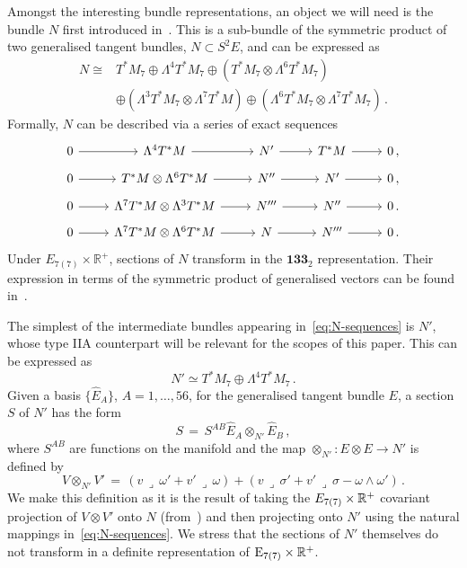 \documentclass[debug]{phd}
\begin{document}
			Amongst the interesting bundle representations, an object we will need is the bundle $N$ first introduced in~\cite{Coimbra:2011ky}. 
			This is a sub-bundle of the symmetric product of two generalised tangent bundles, $N \subset S^2 E$, and can be expressed as
				\begin{equation}\label{MthNbundle}
					\begin{split}
						N \cong & T^*M_7 \oplus \Lambda^4 T^*M_7 \oplus (T^*M_7 \otimes \Lambda^6T^*M_7) \\[1mm]
						& \oplus (\Lambda^3T^*M_7\otimes \Lambda^7T^*M)\oplus (\Lambda^6T^*M_7 \otimes \Lambda^7T^*M_7) \,.
					\end{split}
				\end{equation}
Formally, $N$ can be described via a series of exact sequences
%
\begin{equation}
\label{eq:N-sequences}
\begin{tikzcd}[row sep=tiny]
										0 \arrow{r} &\Lambda^4 T^*M \arrow{r} &N' \arrow{r} &T^*M \arrow{r} &0 	\, , \\
										0 \arrow{r} & T^*M\otimes \Lambda^6T^*M  \arrow{r} &N'' \arrow{r} &N' \arrow{r} &0 	\, , \\
										0 \arrow{r} &\Lambda^7 T^*M \otimes \Lambda^3 T^*M \arrow{r} &N''' \arrow{r} &N'' \arrow{r} &0 \, . \\
										0 \arrow{r} &\Lambda^7 T^*M \otimes \Lambda^6 T^*M \arrow{r} &N \arrow{r} &N''' \arrow{r} &0 \, .
									\end{tikzcd}
\end{equation}
%
Under $E_{7(7)}\times \mathbb{R}^+$, sections of $N$ transform in the $\mathbf{133}_{2}$ representation. 
Their expression in terms of the symmetric product of generalised vectors can be found in~\cite{Coimbra:2011ky}. 

The simplest of the intermediate bundles appearing in~\eqref{eq:N-sequences} is $N'$, whose type IIA counterpart will be relevant for the scopes of this paper. This can be expressed as
\begin{equation}\label{MthN'}
N' \simeq  T^*M_7 \oplus \Lambda^4 T^*M_7\,.
\end{equation}
Given a basis $\{\hat E_A\}$, $A = 1,\ldots, 56$, for the generalised tangent bundle $E$, a section $S$ of $N'$ has the form
\begin{equation}
S \,=\, S^{AB}\hat E_A \otimes_{N'} \hat E_B \,,
\end{equation}
where $S^{AB}$ are functions on the manifold and the map $\otimes_{N'}: E \otimes E \to N'$ is defined by
\begin{equation}\label{N'prod_Mth}
V \otimes_{N'} V' \,=\, (v \,\lrcorner\, \omega' + v'\,\lrcorner\,\omega) + (v \,\lrcorner\, \sigma' + v' \,\lrcorner\, \sigma - \omega \wedge \omega')\,.
\end{equation}
We make this definition as it is the result of taking the $E_{7(7)}\times\mathbb{R}^+$ covariant projection of $V\otimes V'$ onto $N$ (from~\cite{Coimbra:2011ky}) and then projecting onto $N'$ using the natural mappings in~\eqref{eq:N-sequences}. We stress that the sections of $N'$ themselves do not transform in a definite representation of $\mathrm{E}_{7(7)}\times \mathbb{R}^+$.
\end{document}
